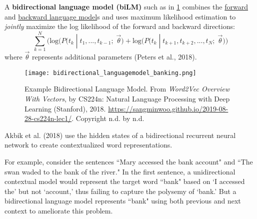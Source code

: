 A \textbf{bidirectional language model (biLM)} such as in \cref{fig:bidirectionalLM} combines the \hyperref[sec:ForwardLM]{forward} and \hyperref[sec:BackwardLM]{backward language model}s and uses maximum likelihood estimation to \emph{jointly} maximize the log likelihood of the forward and backward directions: 
$$
\sum_{k=1}^N \Big( \text{log} \Big( P \Big(t_k \; | \; t_1,...,t_{k-1}; \; \overrightarrow{\theta} \Big) + \text{log} \Big( P \Big(t_k \; | \; t_{k+1}, t_{k+2}, ..., t_N; \; \overrightarrow{\theta} \Big) \Big)
$$
where $\overrightarrow{\theta}$ represents additional parameters (Peters et al., 2018). 


\begin{figure}[h]
\vspace{-5pt}
\centering
\texttt{[image: bidirectional\_languagemodel\_banking.png]}
\vspace{-5pt}
\caption{\footnotesize Example Bidirectional Language Model. From \emph{Word2Vec Overview With Vectors}, by CS224n: Natural Language Processing with Deep Learning (Stanford), 2018. \url{https://sangminwoo.github.io/2019-08-28-cs224n-lec1/}. Copyright n.d. by n.d.}
\vspace{-5pt}
\label{fig:bidirectionalLM}
\end{figure}

Akbik et al. (2018) use the hidden states of a bidirectional recurrent neural network to create contextualized word representations. 

For example, consider the sentences ``Mary accessed the bank account" and ``The swan waded to the bank of the river." In the first sentence, a unidirectional contextual model would represent the target word ``bank" based on `I accessed the' but not `account,' thus failing to capture the polysemy of `bank.' But a bidirectional language model represents ``bank" using both previous and next context to ameliorate this problem.

